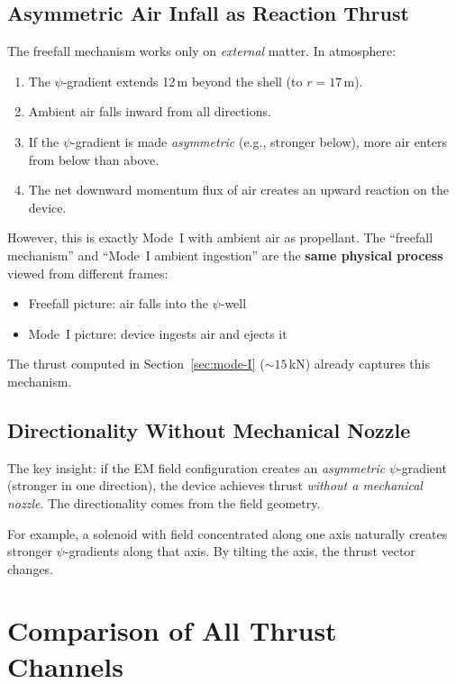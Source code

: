 \documentclass[12pt,letterpaper]{article}
\begin{document}
\subsection{Asymmetric Air Infall as Reaction Thrust}

The freefall mechanism works only on \textit{external} matter. In atmosphere:

\begin{enumerate}
\item The $\psi$-gradient extends 12\,m beyond the shell (to $r = 17$\,m).
\item Ambient air falls inward from all directions.
\item If the $\psi$-gradient is made \textit{asymmetric} (e.g., stronger below),
more air enters from below than above.
\item The net downward momentum flux of air creates an upward reaction on the device.
\end{enumerate}

However, this is exactly Mode~I with ambient air as propellant. The
``freefall mechanism'' and ``Mode~I ambient ingestion'' are the \textbf{same
physical process} viewed from different frames:
\begin{itemize}
\item Freefall picture: air falls into the $\psi$-well
\item Mode~I picture: device ingests air and ejects it
\end{itemize}

The thrust computed in Section~\ref{sec:mode-I} ($\sim 15$\,kN) already
captures this mechanism.

\subsection{Directionality Without Mechanical Nozzle}

The key insight: if the EM field configuration creates an \textit{asymmetric}
$\psi$-gradient (stronger in one direction), the device achieves thrust
\textit{without a mechanical nozzle}. The directionality comes from the
field geometry.

For example, a solenoid with field concentrated along one axis naturally
creates stronger $\psi$-gradients along that axis. By tilting the axis,
the thrust vector changes.

\section{Comparison of All Thrust Channels}
\label{sec:comparison}
\end{document}

